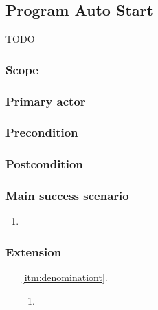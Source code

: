 \subsection{Program Auto Start}\label{subsec:usecase_auto_start}
TODO
\subsubsection{Scope}

\subsubsection{Primary actor}

\subsubsection{Precondition}

\subsubsection{Postcondition}

\subsubsection{Main success scenario}
\begin{enumerate}
	\item \label{itm:denomination} 
\end{enumerate}
\subsubsection{Extension}
\begin{enumerate}
	\item[\ref{itm:denominationt}.]
	\begin{enumerate}[i]
		\item 
	\end{enumerate}
\end{enumerate}